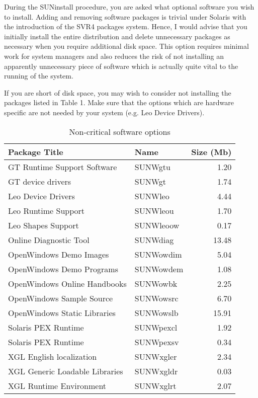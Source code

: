 During the SUNinstall procedure, you are asked what optional software you 
wish to install. Adding and removing software packages is trivial
under Solaris with the introduction of the SVR4 packages system. Hence, 
I would advise that you initially install the entire distribution and 
delete unnecessary packages as necessary when you require additional 
disk space. This option requires minimal work for system managers and also
reduces the risk of not installing an apparently unnecessary piece of software
which is actually quite vital to the running of the system. 

If you are short of disk space, you may wish to consider not installing the
packages listed in Table 1. Make sure that the options which are hardware specific
are not needed by your system (e.g. Leo Device Drivers). 

\begin{table}[htb]
\begin{center}
\begin{tabular}{||l|l|r||}
\hline

Package Title & Name & Size (Mb)\\
\hline
GT Runtime Support Software	& SUNWgtu	& 1.20  \\
GT device drivers 		& SUNWgt	& 1.74  \\
Leo Device Drivers		& SUNWleo	& 4.44  \\
Leo Runtime Support		& SUNWleou	& 1.70  \\
Leo Shapes Support		& SUNWleoow	& 0.17  \\
Online Diagnostic Tool		& SUNWdiag	& 13.48 \\
OpenWindows Demo Images		& SUNWowdim	& 5.04  \\
OpenWindows Demo Programs	& SUNWowdem	& 1.08  \\
OpenWindows Online Handbooks	& SUNWowbk	& 2.25 	\\
OpenWindows Sample Source	& SUNWowsrc	& 6.70  \\
OpenWindows Static Libraries	& SUNWowslb	& 15.91 \\
Solaris PEX Runtime		& SUNWpexcl	& 1.92  \\
Solaris PEX Runtime		& SUNWpexsv	& 0.34  \\
XGL English localization	& SUNWxgler	& 2.34  \\
XGL Generic Loadable Libraries	& SUNWxgldr	& 0.03  \\
XGL Runtime Environment		& SUNWxglrt	& 2.07  \\
\hline
\end {tabular}
\caption{Non-critical software options}
\end{center}
\end {table}

